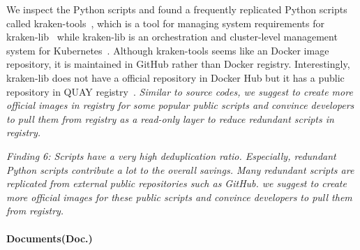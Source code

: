 We inspect the Python scripts and found a frequently replicated Python scripts called kraken-tools~\cite{xxx}, which is a tool for managing system requirements for kraken-lib~\cite{xxx} while kraken-lib is an orchestration and cluster-level management system for Kubernetes~\cite{xxx}.
%
Although kraken-tools seems like an Docker image repository, it is maintained in GitHub rather than Docker registry. Interestingly, kraken-lib does not have a official repository in Docker Hub but it has a public repository in QUAY registry~\cite{xxx}.
\textit{Similar to source codes, we suggest to create more official images in registry for some popular public scripts %
and convince developers to pull them from registry as a read-only layer to reduce redundant scripts in registry.}

\textit{Finding 6: Scripts have a very high deduplication ratio. Especially, redundant Python scripts contribute a lot to the overall savings. Many redundant scripts are replicated from external public repositories such as GitHub. 
we suggest to create more official images for these public scripts and convince developers to pull them from registry.}
%

\paragraph{Documents(Doc.)}

